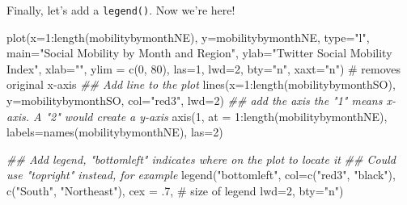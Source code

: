 \documentclass[
  letterpaper,
  DIV=11,
  numbers=noendperiod]{scrreprt}
\newenvironment{Shaded}{\begin{snugshade}}{\end{snugshade}}
\newcommand{\AttributeTok}[1]{\textcolor[rgb]{0.40,0.45,0.13}{#1}}
\newcommand{\CommentTok}[1]{\textcolor[rgb]{0.37,0.37,0.37}{#1}}
\newcommand{\DecValTok}[1]{\textcolor[rgb]{0.68,0.00,0.00}{#1}}
\newcommand{\DocumentationTok}[1]{\textcolor[rgb]{0.37,0.37,0.37}{\textit{#1}}}
\newcommand{\FunctionTok}[1]{\textcolor[rgb]{0.28,0.35,0.67}{#1}}
\newcommand{\NormalTok}[1]{\textcolor[rgb]{0.00,0.23,0.31}{#1}}
\newcommand{\SpecialCharTok}[1]{\textcolor[rgb]{0.37,0.37,0.37}{#1}}
\newcommand{\StringTok}[1]{\textcolor[rgb]{0.13,0.47,0.30}{#1}}
\begin{document}
Finally, let's add a \texttt{legend()}. Now we're here!

\begin{Shaded}
\begin{Highlighting}[]
\FunctionTok{plot}\NormalTok{(}\AttributeTok{x=}\DecValTok{1}\SpecialCharTok{:}\FunctionTok{length}\NormalTok{(mobilitybymonthNE),}
     \AttributeTok{y=}\NormalTok{mobilitybymonthNE,}
     \AttributeTok{type=}\StringTok{"l"}\NormalTok{, }
     \AttributeTok{main=}\StringTok{"Social Mobility by Month and Region"}\NormalTok{,}
     \AttributeTok{ylab=}\StringTok{"Twitter Social Mobility Index"}\NormalTok{,}
     \AttributeTok{xlab=}\StringTok{""}\NormalTok{,}
     \AttributeTok{ylim =} \FunctionTok{c}\NormalTok{(}\DecValTok{0}\NormalTok{, }\DecValTok{80}\NormalTok{),}
     \AttributeTok{las=}\DecValTok{1}\NormalTok{, }
     \AttributeTok{lwd=}\DecValTok{2}\NormalTok{, }
     \AttributeTok{bty=}\StringTok{"n"}\NormalTok{,}
     \AttributeTok{xaxt=}\StringTok{"n"}\NormalTok{) }\CommentTok{\# removes original x{-}axis}
\DocumentationTok{\#\# Add line to the plot }
\FunctionTok{lines}\NormalTok{(}\AttributeTok{x=}\DecValTok{1}\SpecialCharTok{:}\FunctionTok{length}\NormalTok{(mobilitybymonthSO),}
     \AttributeTok{y=}\NormalTok{mobilitybymonthSO, }\AttributeTok{col=}\StringTok{"red3"}\NormalTok{, }\AttributeTok{lwd=}\DecValTok{2}\NormalTok{)}
\DocumentationTok{\#\# add the axis the "1" means x{-}axis. A "2" would create a y{-}axis}
\FunctionTok{axis}\NormalTok{(}\DecValTok{1}\NormalTok{, }\AttributeTok{at =} \DecValTok{1}\SpecialCharTok{:}\FunctionTok{length}\NormalTok{(mobilitybymonthNE), }
     \AttributeTok{labels=}\FunctionTok{names}\NormalTok{(mobilitybymonthNE), }\AttributeTok{las=}\DecValTok{2}\NormalTok{)}

\DocumentationTok{\#\# Add legend, "bottomleft" indicates where on the plot to locate it}
\DocumentationTok{\#\# Could use "topright" instead, for example}
\FunctionTok{legend}\NormalTok{(}\StringTok{"bottomleft"}\NormalTok{,  }\AttributeTok{col=}\FunctionTok{c}\NormalTok{(}\StringTok{"red3"}\NormalTok{, }\StringTok{"black"}\NormalTok{), }
       \FunctionTok{c}\NormalTok{(}\StringTok{"South"}\NormalTok{, }\StringTok{"Northeast"}\NormalTok{), }
       \AttributeTok{cex =}\NormalTok{ .}\DecValTok{7}\NormalTok{, }\CommentTok{\# size of legend}
       \AttributeTok{lwd=}\DecValTok{2}\NormalTok{,}
       \AttributeTok{bty=}\StringTok{"n"}\NormalTok{)}
\end{Highlighting}
\end{Shaded}
\end{document}
